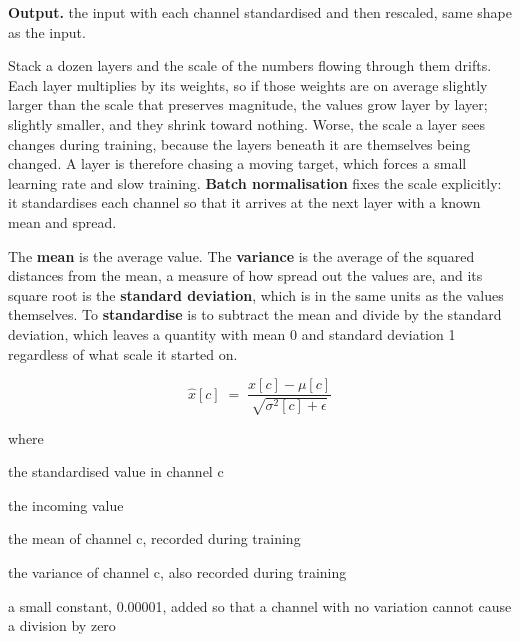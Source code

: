 \noindent\textbf{Output.} the input with each channel standardised and then rescaled, same shape as the input.


Stack a dozen layers and the scale of the numbers flowing through them drifts. Each layer multiplies by its weights, so if those weights are on average slightly larger than the scale that preserves magnitude, the values grow layer by layer; slightly smaller, and they shrink toward nothing. Worse, the scale a layer sees changes during training, because the layers beneath it are themselves being changed. A layer is therefore chasing a moving target, which forces a small learning rate and slow training. \textbf{Batch normalisation} \cite{ioffe2015} fixes the scale explicitly: it standardises each channel so that it arrives at the next layer with a known mean and spread.


The \textbf{mean} is the average value. The \textbf{variance} is the average of the squared distances from the mean, a measure of how spread out the values are, and its square root is the \textbf{standard deviation}, which is in the same units as the values themselves. To \textbf{standardise} is to subtract the mean and divide by the standard deviation, which leaves a quantity with mean 0 and standard deviation 1 regardless of what scale it started on.


\begin{equation}
\hat{x}[c] \;=\; \frac{x[c] - \mu[c]}{\sqrt{\sigma^{2}[c] + \epsilon}}
\end{equation}

\noindent where
\begin{description}[leftmargin=2.4em,style=nextline,font=\normalfont\ttfamily]\setlength\itemsep{1pt}
  \item[{$\hat{x}[c]$}] \normalfont the standardised value in channel c
  \item[{$x[c]$}] \normalfont the incoming value
  \item[{$\mu[c]$}] \normalfont the mean of channel c, recorded during training
  \item[{$\sigma^{2}[c]$}] \normalfont the variance of channel c, also recorded during training
  \item[{$\epsilon$}] \normalfont a small constant, 0.00001, added so that a channel with no variation cannot cause a division by zero
\end{description}

